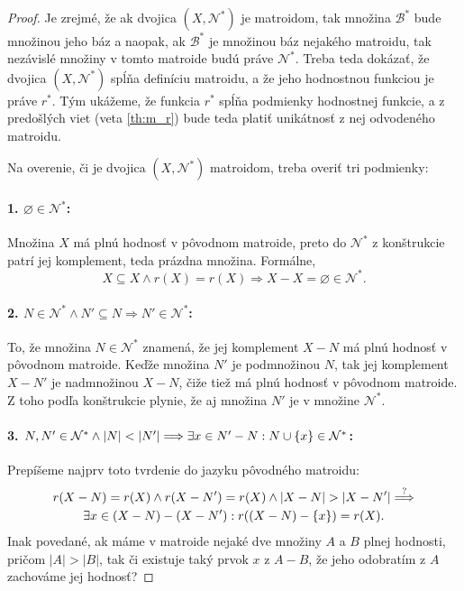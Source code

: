 \begin{proof}
Je zrejmé, že ak dvojica $(X, \mathcal{N}^*)$ je matroidom, tak množina $\mathcal{B}^*$ bude množinou jeho báz a naopak, ak $\mathcal{B}^*$ je množinou báz nejakého matroidu, tak nezávislé množiny v tomto matroide budú práve $\mathcal{N}^*$.
Treba teda dokázať, že dvojica $(X, \mathcal{N}^*)$ spĺňa definíciu matroidu, a že jeho hodnostnou funkciou je práve $r^*$.
Tým ukážeme, že funkcia $r^*$ spĺňa podmienky hodnostnej funkcie, a z predošlých viet (veta \ref{th:m_r}) bude teda platiť unikátnosť z nej odvodeného matroidu.

Na overenie, či je dvojica $(X, \mathcal{N}^*)$ matroidom, treba overiť tri podmienky:
\paragraph{1. $\varnothing \in \mathcal{N}^*$:}
Množina $X$ má plnú hodnosť v pôvodnom matroide, preto do $\mathcal{N}^*$ z konštrukcie patrí jej komplement, teda prázdna množina. 
Formálne, $$X \subseteq X \wedge r(X) = r(X) \Longrightarrow X - X = \varnothing \in \mathcal{N}^*.$$
\paragraph{2. $N \in \mathcal{N}^* \wedge N' \subseteq N \Longrightarrow N' \in \mathcal{N}^*$:}
To, že množina $N \in \mathcal{N}^*$ znamená, že jej komplement $X - N$ má plnú hodnosť v pôvodnom matroide.
Keďže množina $N'$ je podmnožinou $N$, tak jej komplement $X - N'$ je nadmnožinou $X - N$, čiže tiež má plnú hodnosť v pôvodnom matroide.
Z toho podľa konštrukcie plynie, že aj množina $N'$ je v množine $\mathcal{N}^*$.
\paragraph{3. $N, N' \in \mathcal{N}^* \wedge \left|N\right| < \left|N'\right| \Longrightarrow \exists x \in N' - N: N \cup \left\{x\right\} \in \mathcal{N}^*$:}
Prepíšeme najprv toto tvrdenie do jazyku pôvodného matroidu:
\begin{multline*}
r(X - N)=r(X) \wedge r(X - N')=r(X)\wedge |X-N|>|X-N'| \overset{?}{\Longrightarrow}\\
\exists x \in (X - N) - (X - N'): r((X-N)-\set{x}) = r(X).    
\end{multline*}
Inak povedané, ak máme v matroide nejaké dve množiny $A$ a $B$ plnej hodnosti, pričom $|A| > |B|$, tak či existuje taký prvok $x$ z $A - B$, že jeho odobratím z $A$ zachováme jej hodnosť?


\end{proof}
